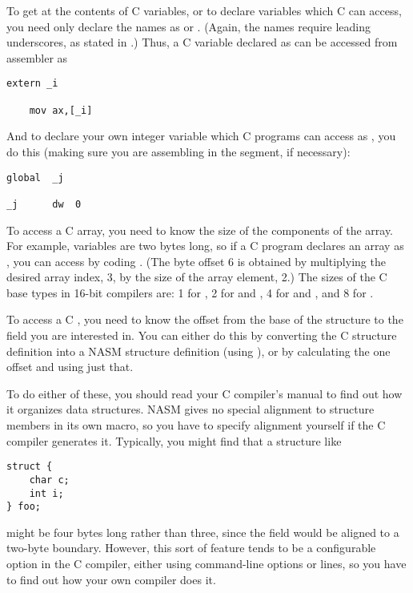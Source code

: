 
To get at the contents of C variables, or to declare variables which
C can access, you need only declare the names as  or
. (Again, the names require leading underscores, as stated
in .) Thus, a C variable declared as 
can be accessed from assembler as

\begin{lstlisting}
extern _i

    mov ax,[_i]
\end{lstlisting}

And to declare your own integer variable which C programs can access
as , you do this (making sure you are assembling in
the  segment, if necessary):

\begin{lstlisting}
global  _j

_j      dw  0
\end{lstlisting}

To access a C array, you need to know the size of the components of
the array. For example,  variables are two bytes long, so if
a C program declares an array as , you can access
 by coding . (The byte offset 6 is obtained
by multiplying the desired array index, 3, by the size of the array
element, 2.) The sizes of the C base types in 16-bit compilers are:
1 for , 2 for  and , 4 for 
and , and 8 for .

To access a C , you need to know the offset from
the base of the structure to the field you are interested in. You
can either do this by converting the C structure definition into a
NASM structure definition (using ), or by calculating the
one offset and using just that.

To do either of these, you should read your C compiler's manual to
find out how it organizes data structures. NASM gives no special
alignment to structure members in its own  macro, so you
have to specify alignment yourself if the C compiler generates it.
Typically, you might find that a structure like

\begin{lstlisting}
struct {
    char c;
    int i;
} foo;
\end{lstlisting}

might be four bytes long rather than three, since the  field
would be aligned to a two-byte boundary. However, this sort of
feature tends to be a configurable option in the C compiler, either
using command-line options or  lines, so you have to find
out how your own compiler does it.


